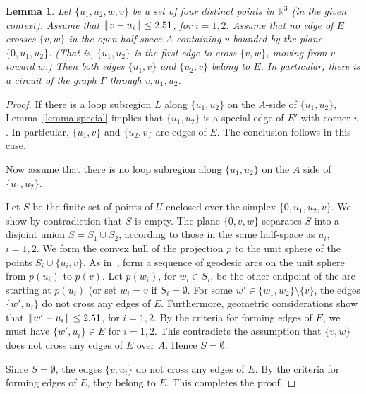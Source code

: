\documentclass[11pt]{amsart}
\newcommand{\ring}[1]{\mathbb{#1}}
\def\|{{\hskip0.1em|\hskip-0.15em|\hskip0.1em}}
\newtheorem{lemma}{Lemma}
\begin{document}
\begin{lemma}\label{lemma:circuit} 
Let $\{u_1,u_2,w,v\}$ be a set of four distinct points
in $\ring{R}^3$ (in the given context).  
Assume that
 $\|v-u_i\|\le 2.51$, for $i=1,2$.
Assume that no edge of $E$ crosses $\{v,w\}$
in the open 
half-space $A$ containing $v$ bounded by the plane $\{0,u_1,u_2\}$.
(That is, $\{u_1,u_2\}$ is the first edge to cross $\{v,w\}$, moving
from $v$ toward $w$.)
Then 
both edges $\{u_1,v\}$ and $\{u_2,v\}$ belong to $E$.
In particular, there is a circuit of the graph $\Gamma$ through $v,u_1,u_2$.
\end{lemma}

\begin{proof} If
there is a loop subregion $L$ along 
$\{u_1,u_2\}$ on the $A$-side
of $\{u_1,u_2\}$, Lemma~\ref{lemma:special} implies that
$\{u_1,u_2\}$ is a special edge of $E'$ with
corner $v$.  In particular, $\{u_1,v\}$ and $\{u_2,v\}$ are
edges of $E$. The conclusion follows in this case.


 Now assume that there is no loop subregion along
$\{u_1,u_2\}$ on the $A$ side of $\{u_1,u_2\}$.

Let $S$ be the finite set of points of $U$ enclosed
over the simplex $\{0,u_1,u_2,v\}$.  We show by contradiction
that $S$ is empty.
The plane $\{0,v,w\}$ separates
$S$ into a disjoint union $S = S_1\cup S_2$, according to those
in the same half-space as $u_i$, $i=1,2$.
We form the convex hull of the projection $p$ to the unit sphere of the 
points $S_i\cup\{u_i,v\}$.  As in~\cite[\S12.13]{Hales:2006:DCG},
form a sequence of geodesic arcs on the unit sphere from $p(u_i)$
to $p(v)$.  Let $p(w_i)$, for $w_i\in S_i$, be the other endpoint
of the arc starting at $p(u_i)$ (or set $w_i=v$ if $S_i=\emptyset$.  
For some $w'\in\{w_1,w_2\}\setminus\{v\}$,  the edges $\{w',u_i\}$ do not cross any edges
of $E$.  Furthermore, geometric considerations show that
$\|w'-u_i\|\le 2.51$, for $i=1,2$.  By the criteria for forming
edges of $E$, we must have $\{w',u_i\}\in E$ for $i=1,2$.  This
contradicts the assumption that $\{v,w\}$ does not cross any edges
of $E$ over $A$.  Hence $S=\emptyset$.

Since $S=\emptyset$, the edges $\{v,u_i\}$ do not cross any edges
of $E$.  By the criteria for forming edges of $E$, they belong to $E$.
This completes the proof.
\end{proof}
\end{document}
